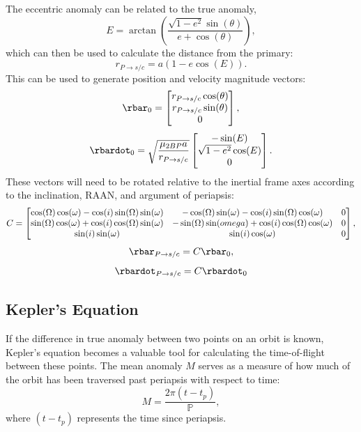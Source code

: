 The eccentric anomaly can be related to the true anomaly,
\begin{equation}
    E=\arctan(\frac{\sqrt{1-e^{2}}\sin(\theta)}{e+\cos(\theta)}),
    \label{eq:eccentricanomaly}
\end{equation}
which can then be used to calculate the distance from the primary:
\begin{equation}
    r_{P\rightarrow s/c}=a(1-e\cos(E)).
    \label{eq:circularradius}
\end{equation}
This can be used to generate position and velocity magnitude vectors:
\begin{equation}
    \rbar_{0}=\begin{bmatrix}r_{P\rightarrow s/c}\cos(\theta)\cr r_{P\rightarrow s/c}\sin(\theta)\cr0\end{bmatrix},
    \label{eq:circularpositionvector}
\end{equation}
\begin{equation}
    \rbardot_{0}=\sqrt{\frac{\mu_{2BP}a}{r_{P\rightarrow s/c}}}\begin{bmatrix}-\sin(E)\cr\sqrt{1-e^{2}}\cos(E)\cr0\end{bmatrix}.
    \label{eq:circularvelocityvector}
\end{equation}
These vectors will need to be rotated relative to the inertial frame axes according to the
inclination, RAAN, and argument of periapsis:
\begin{equation}
    C=\begin{bmatrix}\cos(\Omega)\cos(\omega)-\cos(i)\sin(\Omega)\sin(\omega)&-\cos(\Omega)\sin(\omega)-\cos(i)\sin(\Omega)\cos(\omega)&0\cr\sin(\Omega)\cos(\omega)+\cos(i)\cos(\Omega)\sin(\omega)&-\sin(\Omega)\sin(omega)+\cos(i)\cos(\Omega)\cos(\omega)&0\cr\sin(i)\sin(\omega)&\sin(i)\cos(\omega)&0\end{bmatrix},
    \label{eq:elementrotation}
\end{equation}
\begin{equation}
    \rbar_{P\rightarrow s/c}=C\rbar_{0},
    \label{eq:positionvector}
\end{equation}
\begin{equation}
    \rbardot_{P\rightarrow s/c}=C\rbardot_{0}
\end{equation}

\subsection{Kepler's Equation}
If the difference in true anomaly between two points on an orbit is known, Kepler's equation
becomes a valuable tool for calculating the time-of-flight between these points. The mean anomaly
$M$ serves as a measure of how much of the orbit has been traversed past periapsis with respect to
time:
\begin{equation}
    M=\frac{2\pi(t-t_{p})}{\mathbb{P}},
    \label{eq:meananomaly}
\end{equation}
where $(t-t_{p})$ represents the time since periapsis.

